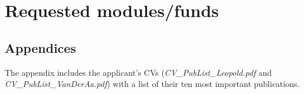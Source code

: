 \documentclass{scrartcl}
\begin{document}
\section{Requested modules/funds}


\subsection*{Appendices}

The appendix includes the applicant's CVs (\textit{CV\_PubList\_Leopold.pdf} and \textit{CV\_PubList\_VanDerAa.pdf}) with a list of their ten most important publications.  
\end{document}
